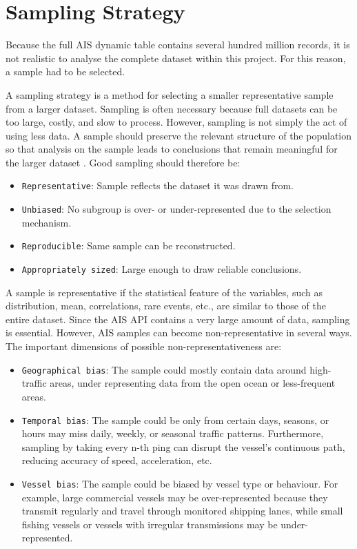\documentclass[10pt,a4paper]{article}
\begin{document}
\section {Sampling Strategy}

Because the full AIS dynamic table contains several hundred million records, it is not realistic to analyse the complete
dataset within this project. For this reason, a sample had to be selected.

A sampling strategy is a method for selecting a smaller representative sample from a larger dataset. Sampling
is often necessary because full datasets can be too large, costly, and slow to process. However, sampling is not
simply the act of using less data. A sample should preserve the relevant structure of the population so that
analysis on the sample leads to conclusions that remain meaningful for the larger dataset \cite{12}.
Good sampling should therefore be:

\begin{itemize}
    \item \texttt{Representative}: Sample reflects the dataset it was drawn from.
    \item \texttt{Unbiased}: No subgroup is over- or under-represented due to the selection mechanism.
    \item \texttt{Reproducible}: Same sample can be reconstructed.
    \item \texttt{Appropriately sized}: Large enough to draw reliable conclusions.
\end{itemize}

A sample is representative if the statistical feature of the variables, such as distribution, mean, correlations,
rare events, etc., are similar to those of the entire dataset. Since the AIS API contains a very large amount
of data, sampling is essential. However, AIS samples can become non-representative in several ways. The
important dimensions of possible non-representativeness are:

\begin{itemize}
    \item \texttt{Geographical bias}: The sample could mostly contain data around high-traffic areas, under representing
                  data from the open ocean or less-frequent areas.
    \item \texttt{Temporal bias}: The sample could be only from certain days, seasons, or hours may miss daily, weekly,
                  or seasonal traffic patterns. Furthermore, sampling by taking every n-th ping can disrupt the vessel's
                  continuous path, reducing accuracy of speed, acceleration, etc.
    \item \texttt{Vessel bias}: The sample could be biased by vessel type or behaviour. For example, large commercial
                  vessels may be over-represented because they transmit regularly and travel through monitored shipping
                  lanes, while small fishing vessels or vessels with irregular transmissions may be under-represented.
\end{itemize}
\end{document}

